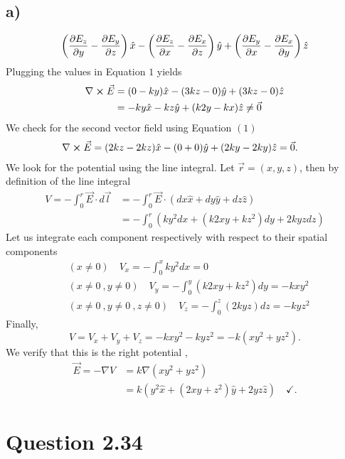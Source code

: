\documentclass[
	12pt,
	]{article}
\theoremstyle{definition}
\theoremstyle{definition}
\theoremstyle{definition}
\theoremstyle{definition}
\theoremstyle{definition}
\theoremstyle{example}
\theoremstyle{note}
\theoremstyle{remark}
\theoremstyle{example}
\begin{document}
			\subsection*{a) }
				\begin{equation}
					\left(\pdv{E_{z}}{y} - \pdv{E_{y}}{z}\right)\hat{x} - \left(\pdv{E_{z}}{x} - \pdv{E_{x}}{z}\right)\hat{y} + 	\left(\pdv{E_{y}}{x} - \pdv{E_{x}}{y}\right)\hat{z}
				\end{equation}
				Plugging the values in Equation $1$ yields 
				\begin{align*}
					\nabla \cross \vec{E} &= (0-ky)\hat{x} -(3kz -0) \hat{y} + (3kz-0 )\hat{z} \\
					&=-ky \hat{x} -kz \hat{y} +(k2y - kx)\hat{z} \neq \vec{0}
				\end{align*}
				We check for the second vector field using Equation $(1)$
				\begin{align*}
					\nabla \cross \vec{E} &= (2kz - 2kz) \hat{x} - (0+0)\hat{y} +(2ky - 2ky)\hat{z} = \vec{0}.
				\end{align*}
				We look for the potential using the line integral. Let $\vec{r} = (x,y,z)$, then by definition of the line integral 
				\begin{align*}
					V = -\int_{0}^{r} \vec{E} \cdot d\vec{l} &= -\int_{0}^{r} \vec{E}\cdot (dx\hat{x} +dy \hat{y} + dz\hat{z}) \\ 
					&= -\int_{0}^{r} (ky^{2}dx + (k2xy + kz^{2})dy + 2kyzdz)
				\end{align*}
				Let us integrate each component respectively with respect to their spatial components
				\begin{align*}
					&(x \neq 0) \quad V_{x} = - \int_{0}^{x} ky^{2}dx = 0 \\
					&(x \neq 0 \ , y \neq 0)  \quad V_{y} =-\int_{0}^{y} (k2xy+kz^{2})dy = -kxy^{2} \\
					&(x \neq 0 \ , y \neq 0 \ , z \neq 0) \quad V_{z} =- \int_{0}^{z} (2kyz)dz = -kyz^{2} 
				\end{align*}
				Finally, 
				$$ V = V_{x} + V_{y} + V_{z} = -kxy^{2} - kyz^{2} = -k(xy^{2} +yz^{2}).$$
				We verify that this is the right potential ,
				\begin{align*}
					\vec{E} = -\nabla V &= k \nabla (xy^{2} + yz^{2}) \\
					&= k(y^{2} \hat{x} + (2xy+z^{2})\hat{y} +2yz\hat{z}) \quad \checkmark.
				\end{align*}
		\section*{Question 2.34}
\end{document}

